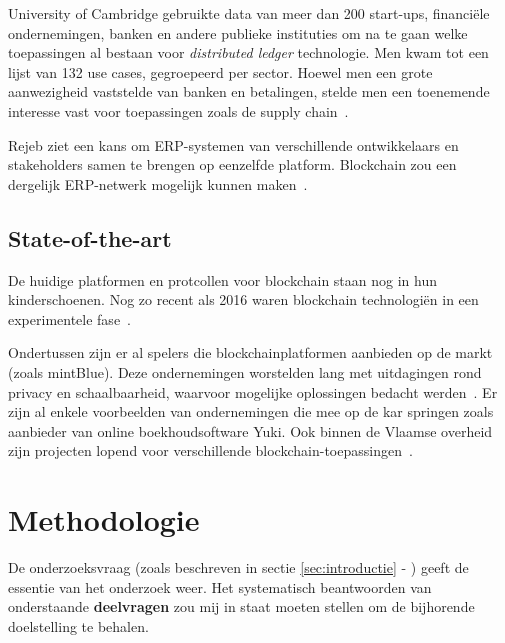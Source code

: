 University of Cambridge gebruikte data van meer dan 200 start-ups, financiële ondernemingen, banken en andere publieke instituties om na te gaan welke toepassingen al bestaan voor \textit{distributed ledger} technologie. Men kwam tot een lijst van 132 use cases, gegroepeerd per sector. Hoewel men een grote aanwezigheid vaststelde van banken en betalingen, stelde men een toenemende interesse vast voor toepassingen zoals de supply chain~\autocite{Hileman2017}.

Rejeb ziet een kans om ERP-systemen van verschillende ontwikkelaars en stakeholders samen te brengen op eenzelfde platform. Blockchain zou een dergelijk ERP-netwerk mogelijk kunnen maken~\autocite{Rejeb2018}.

\subsection{State-of-the-art}
\label{sub:state-of-the-art}

De huidige platformen en protcollen voor blockchain staan nog in hun kinderschoenen. Nog zo recent als 2016 waren blockchain technologiën in een experimentele fase~\autocite{Davidson2016}.

Ondertussen zijn er al spelers die blockchainplatformen aanbieden op de markt (zoals mintBlue). Deze ondernemingen worstelden lang met uitdagingen rond privacy en schaalbaarheid, waarvoor mogelijke oplossingen bedacht werden~\autocite{Kaptijn}. Er zijn al enkele voorbeelden van ondernemingen die mee op de kar springen zoals aanbieder van online boekhoudsoftware Yuki. Ook binnen de Vlaamse overheid zijn projecten lopend voor verschillende blockchain-toepassingen~\autocite{Schiltz2018}.




\section{Methodologie}
\label{sec:methodologie}

De onderzoeksvraag (zoals beschreven in sectie \ref{sec:introductie} - ) geeft de essentie van het onderzoek weer. Het systematisch beantwoorden van onderstaande \textbf{deelvragen} zou mij in staat moeten stellen om de bijhorende doelstelling te behalen.

